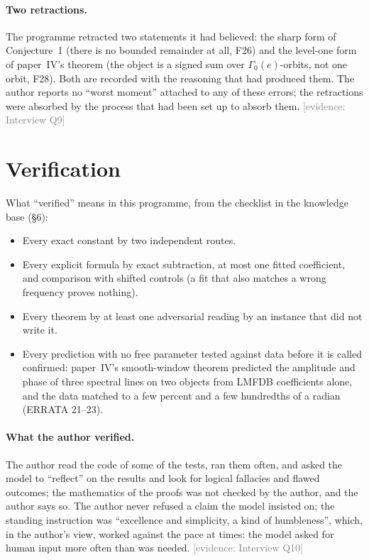 \documentclass[11pt,a4paper]{article}
\newcommand{\evidence}[1]{{\footnotesize\textcolor{Gray}{[evidence: #1]}}}
\begin{document}
\paragraph{Two retractions.} The programme retracted two statements it had believed: the sharp form of
Conjecture~1 (there is no bounded remainder at all, F26) and the level-one form of paper~IV's theorem (the object
is a signed sum over $\Gamma_0(e)$-orbits, not one orbit, F28). Both are recorded with the reasoning that had
produced them.
The author reports no ``worst moment'' attached to any of these errors; the retractions were absorbed by the
process that had been set up to absorb them. \evidence{Interview Q9}

\section{Verification}\label{sec:verification}

What ``verified'' means in this programme, from the checklist in the knowledge base (\S6):
\begin{itemize}[itemsep=1pt]
\item Every exact constant by two independent routes.
\item Every explicit formula by exact subtraction, at most one fitted coefficient, and comparison with shifted
  controls (a fit that also matches a wrong frequency proves nothing).
\item Every theorem by at least one adversarial reading by an instance that did not write it.
\item Every prediction with no free parameter tested against data before it is called confirmed: paper~IV's
  smooth-window theorem predicted the amplitude and phase of three spectral lines on two objects from LMFDB
  coefficients alone, and the data matched to a few percent and a few hundredths of a radian (ERRATA 21--23).
\end{itemize}
\paragraph{What the author verified.} The author read the code of some of the tests, ran them often, and asked the
model to ``reflect'' on the results and look for logical fallacies and flawed outcomes; the mathematics of the
proofs was not checked by the author, and the author says so. The author never refused a claim the model insisted
on; the standing instruction was ``excellence and simplicity, a kind of humbleness'', which, in the author's view,
worked against the pace at times: the model asked for human input more often than was needed. \evidence{Interview Q10}
\end{document}
